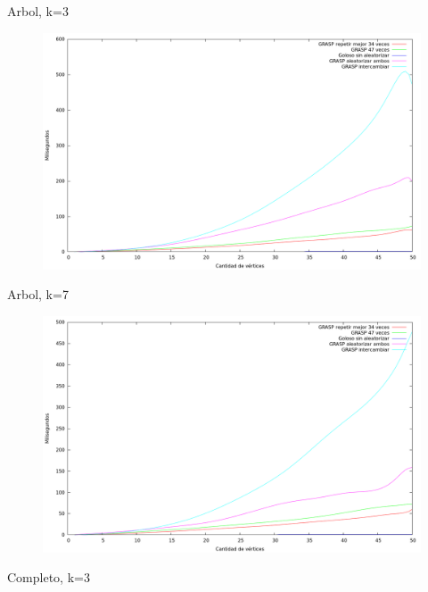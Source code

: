 Arbol, k=3

\begin{figure}[H]
  \begin{center}
    \includegraphics[scale=0.35]{imagenes/ej6-arbol-k3-tiempo.png}
  \end{center}
\end{figure}

Arbol, k=7

\begin{figure}[H]
  \begin{center}
    \includegraphics[scale=0.35]{imagenes/ej6-arbol-k7-tiempo.png}
  \end{center}
\end{figure}

Completo, k=3

